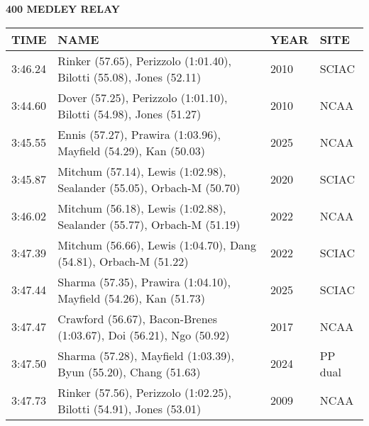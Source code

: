\begin{center}
\begin{minipage}[t]{0.7\textwidth}
\centering
\textbf{400 MEDLEY RELAY}\\[0.05cm]
\begin{tabular}{@{}p{1.8cm}p{2.8cm}p{1.2cm}p{1.4cm}@{}}
\hline
\textbf{TIME} & \textbf{NAME} & \textbf{YEAR} & \textbf{SITE} \\
\hline
3:46.24 & Rinker (57.65), Perizzolo (1:01.40), Bilotti (55.08), Jones (52.11) & 2010 & SCIAC \\
3:44.60 & Dover (57.25), Perizzolo (1:01.10), Bilotti (54.98), Jones (51.27) & 2010 & NCAA \\
3:45.55 & Ennis (57.27), Prawira (1:03.96), Mayfield (54.29), Kan (50.03) & 2025 & NCAA \\
3:45.87 & Mitchum (57.14), Lewis (1:02.98), Sealander (55.05), Orbach-M (50.70) & 2020 & SCIAC \\
3:46.02 & Mitchum (56.18), Lewis (1:02.88), Sealander (55.77), Orbach-M (51.19) & 2022 & NCAA \\
3:47.39 & Mitchum (56.66), Lewis (1:04.70), Dang (54.81), Orbach-M (51.22) & 2022 & SCIAC \\
3:47.44 & Sharma (57.35), Prawira (1:04.10), Mayfield (54.26), Kan (51.73) & 2025 & SCIAC \\
3:47.47 & Crawford (56.67), Bacon-Brenes (1:03.67), Doi (56.21), Ngo (50.92) & 2017 & NCAA \\
3:47.50 & Sharma (57.28), Mayfield (1:03.39), Byun (55.20), Chang (51.63) & 2024 & PP dual \\
3:47.73 & Rinker (57.56), Perizzolo (1:02.25), Bilotti (54.91), Jones (53.01) & 2009 & NCAA \\
\hline
\end{tabular}
\end{minipage}
\end{center}

\vspace{0.4cm}

